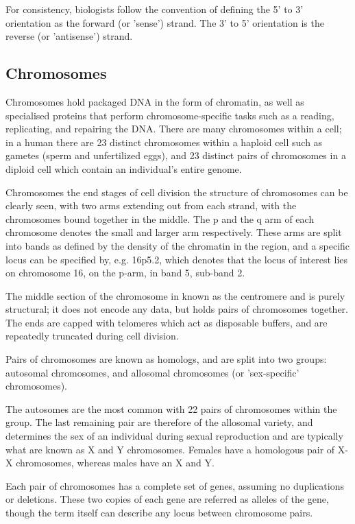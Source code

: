 For consistency, biologists follow the convention of defining the 5' to 3' orientation as the \gls{forward} (or '\gls{sense}') strand. The 3' to 5' orientation is the \gls{reverse} (or '\gls{antisense}') strand.

\subsection{Chromosomes}

Chromosomes hold packaged DNA in the form of \gls{chromatin}, as well as specialised proteins that perform chromosome-specific tasks such as a reading, replicating, and repairing the DNA. There are many chromosomes within a cell; in a human there are 23 distinct chromosomes within a \gls{haploid} cell such as gametes (sperm and unfertilized eggs), and 23 distinct pairs of chromosomes in a \gls{diploid} cell which contain  an individual's entire genome.

Chromosomes the end stages of cell division the structure of chromosomes can be clearly seen, with two arms extending out from each strand, with the chromosomes bound together in the middle. The p and the q arm of each chromosome denotes the small and larger arm respectively. These arms are split into bands as defined by the density of the chromatin in the region, and a specific locus can be specified by, e.g. 16p5.2, which denotes that the locus of interest lies on chromosome 16, on the p-arm, in band 5, sub-band 2.

The middle section of the chromosome in known as the \gls{centromere} and is purely structural; it does not encode any data, but holds pairs of chromosomes together. The ends are capped with \gls{telomeres} which act as disposable buffers, and are repeatedly truncated during cell division.

Pairs of chromosomes are known as \gls{homologs}, and are split into two groups: \gls{autosomal} chromosomes, and \gls{allosomal} chromosomes (or 'sex-specific' chromosomes).

The autosomes are the most common with 22 pairs of chromosomes within the group. The last remaining pair are therefore of the allosomal variety, and determines the sex of an individual during sexual reproduction and are typically what are known as X and Y chromosomes. Females have a homologous pair of X-X chromosomes, whereas males have an X and Y.

Each pair of chromosomes has a complete set of genes, assuming no duplications or deletions. These two copies of each gene are referred as \gls{alleles} of the gene, though the term itself can describe any locus between chromosome pairs.


